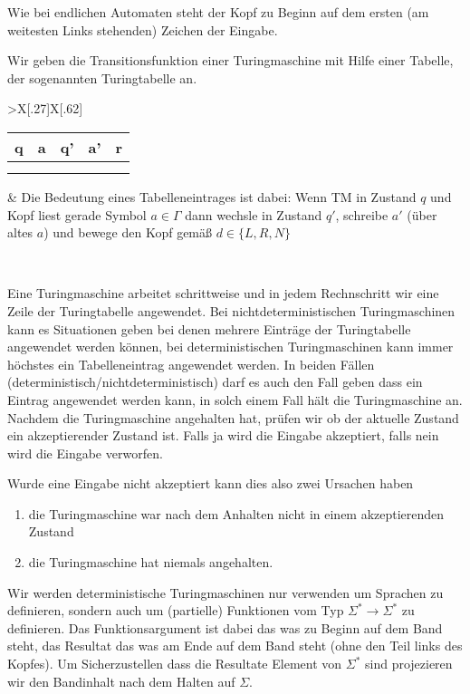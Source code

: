 Wie bei endlichen Automaten steht der Kopf zu Beginn auf dem ersten (am weitesten Links stehenden) Zeichen der Eingabe.
 
 \smallskip
 
 Wir geben die Transitionsfunktion einer Turingmaschine mit Hilfe einer Tabelle, der sogenannten Turingtabelle an.
 
 \begin{tabu}{>{\bfseries}X[.27]X[.62]}
	\begin{tabular}{|*5{c|}}
		q & a & q' & a' & r \\\hline
		&&&&\\
		&&&&
	\end{tabular}
	& 	Die Bedeutung eines Tabelleneintrages ist dabei: Wenn \ac{TM} in Zustand $q$ und Kopf liest
        gerade Symbol $a\in\Gamma$ dann wechsle in Zustand $q'$,
        schreibe $a'$ (über altes $a$) und bewege den Kopf gemäß
        $d\in\{L,R,N\}$ 
\end{tabu}\

Eine Turingmaschine arbeitet schrittweise und in jedem Rechnschritt wir eine Zeile der Turingtabelle angewendet.
Bei nichtdeterministischen Turingmaschinen kann es Situationen geben bei denen mehrere Einträge der Turingtabelle angewendet werden können,
bei deterministischen Turingmaschinen kann immer höchstes ein Tabelleneintrag angewendet werden.
In beiden Fällen (deterministisch/nichtdeterministisch) darf es auch den Fall geben dass ein Eintrag angewendet werden kann,
in solch einem Fall hält die Turingmaschine an.
Nachdem die Turingmaschine angehalten hat, prüfen wir ob der aktuelle Zustand ein akzeptierender Zustand ist. Falls ja wird die Eingabe akzeptiert, falls nein wird die Eingabe verworfen.

Wurde eine Eingabe nicht akzeptiert kann dies also zwei Ursachen haben
\begin{enumerate}
 \item die Turingmaschine war nach dem Anhalten nicht in einem akzeptierenden Zustand
 \item die Turingmaschine hat niemals angehalten.
\end{enumerate}

Wir werden deterministische Turingmaschinen nur verwenden um Sprachen zu definieren, sondern auch um (partielle) Funktionen vom Typ $\Sigma^*\rightarrow\Sigma^*$ zu definieren.
Das Funktionsargument ist dabei das was zu Beginn auf dem Band steht, das Resultat das was am Ende auf dem Band steht (ohne den Teil links des Kopfes).
Um Sicherzustellen dass die Resultate Element von $\Sigma^*$ sind projezieren wir den Bandinhalt nach dem Halten auf $\Sigma$.

